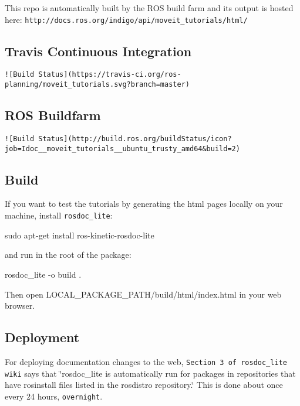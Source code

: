 This repo is automatically built by the R\-O\-S build farm and its output is hosted here\-: {\tt http\-://docs.\-ros.\-org/indigo/api/moveit\-\_\-tutorials/html/}

\subsection*{Travis Continuous Integration}

{\tt ![Build Status](https\-://travis-\/ci.\-org/ros-\/planning/moveit\-\_\-tutorials.\-svg?branch=master)}

\subsection*{R\-O\-S Buildfarm}

{\tt ![Build Status](http\-://build.\-ros.\-org/build\-Status/icon?job=\-Idoc\-\_\-\-\_\-moveit\-\_\-tutorials\-\_\-\-\_\-ubuntu\-\_\-trusty\-\_\-amd64\&build=2)}

\subsection*{Build}

If you want to test the tutorials by generating the html pages locally on your machine, install {\tt rosdoc\-\_\-lite}\-: \begin{DoxyVerb}sudo apt-get install ros-kinetic-rosdoc-lite
\end{DoxyVerb}


and run in the root of the package\-: \begin{DoxyVerb}rosdoc_lite -o build .
\end{DoxyVerb}


Then open {\ttfamily L\-O\-C\-A\-L\-\_\-\-P\-A\-C\-K\-A\-G\-E\-\_\-\-P\-A\-T\-H/build/html/index.\-html} in your web browser.

\subsection*{Deployment}

For deploying documentation changes to the web, {\tt Section 3 of rosdoc\-\_\-lite wiki} says that \char`\"{}rosdoc\-\_\-lite is automatically run for packages in repositories that have rosinstall files listed in the rosdistro repository.\char`\"{} This is done about once every 24 hours, {\tt overnight}. 